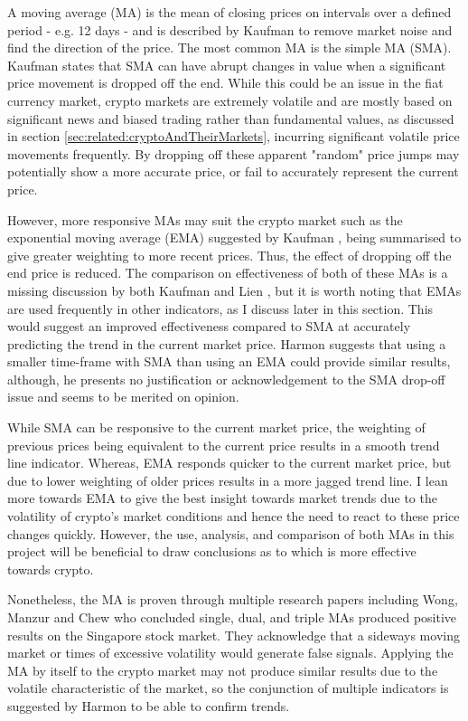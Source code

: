 A moving average (MA) is the mean of closing prices on intervals over a defined period - e.g. 12 days - and is described by Kaufman \cite{BOOK:Kaufman:2013} to remove market noise and find the direction of the price. The most common MA is the simple MA (SMA). Kaufman \cite{BOOK:Kaufman:2013} states that SMA can have abrupt changes in value when a significant price movement is dropped off the end. While this could be an issue in the fiat currency market, crypto markets are extremely volatile and are mostly based on significant news and biased trading rather than fundamental values, as discussed in section \ref{sec:related:cryptoAndTheirMarkets}, incurring significant volatile price movements frequently. By dropping off these apparent "random" price jumps may potentially show a more accurate price, or fail to accurately represent the current price. 

However, more responsive MAs may suit the crypto market such as the exponential moving average (EMA) suggested by Kaufman \cite{BOOK:Kaufman:2013}, being summarised to give greater weighting to more recent prices. Thus, the effect of dropping off the end price is reduced. The comparison on effectiveness of both of these MAs is a missing discussion by both Kaufman \cite{BOOK:Kaufman:2013} and Lien \cite{BOOK:Lien:2016}, but it is worth noting that EMAs are used frequently in other indicators, as I discuss later in this section. This would suggest an improved effectiveness compared to SMA at accurately predicting the trend in the current market price. Harmon \cite{BOOK:Harmon:2014} suggests that using a smaller time-frame with SMA than using an EMA could provide similar results, although, he presents no justification or acknowledgement to the SMA drop-off issue and seems to be merited on opinion. 
    
While SMA can be responsive to the current market price, the weighting of previous prices being equivalent to the current price results in a smooth trend line indicator. Whereas, EMA responds quicker to the current market price, but due to lower weighting of older prices results in a more jagged trend line. I lean more towards EMA to give the best insight towards market trends due to the volatility of crypto's market conditions and hence the need to react to these price changes quickly. However, the use, analysis, and comparison of both MAs in this project will be beneficial to draw conclusions as to which is more effective towards crypto.

Nonetheless, the MA is proven through multiple research papers including Wong, Manzur and Chew \cite{ART:Wong:2003} who concluded single, dual, and triple MAs produced positive results on the Singapore stock market. They acknowledge that a sideways moving market or times of excessive volatility would generate false signals. Applying the MA by itself to the crypto market may not produce similar results due to the volatile characteristic of the market, so the conjunction of multiple indicators is suggested by Harmon \cite{BOOK:Harmon:2014} to be able to confirm trends.  


